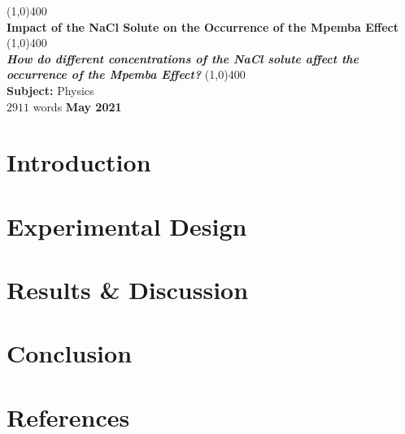 \documentclass[12pt]{article}
\numberwithin{equation}{section}
\begin{document}
\begin{titlepage}

\begin{center}
\vspace*{3cm}
\line(1,0){400}\\[1mm]
\huge{\textbf{Impact of the NaCl Solute on the Occurrence of the Mpemba Effect}} %
\line(1,0){400}\\ \bigskip
\Large{\textbf{\emph{How do different concentrations of the NaCl solute affect the occurrence of the Mpemba Effect?}}} \line(1,0){400}\\  \vspace{2cm} %
\Large{\textbf{Subject:} Physics}\\ \bigskip \bigskip %
\Large{$2911$ words}
\vfill 
\Large{\textbf{May 2021}}

\end{center}

\end{titlepage}


\tableofcontents
\thispagestyle{empty}
\clearpage \setcounter{page}{1}

\setlength{\parskip}{1em}
\section{Introduction}

\section{Experimental Design}


\section{Results \& Discussion}


\section{Conclusion}



\newpage \thispagestyle{plain}
\setlength\bibitemsep{8pt}
\cleardoublepage
{}
\section*{References} 
\printbibliography[type=article,title={Articles}]
\printbibliography[type=book,title={Books}]
\printbibliography[type=manual,title={Apparatus Manuals}]
\printbibliography[type=online,title={Websites}]

\newpage \thispagestyle{plain}

\end{document}
